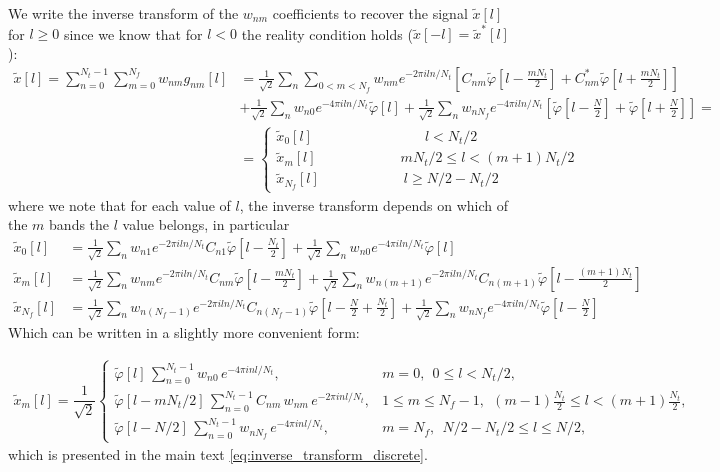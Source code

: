 \documentclass[twocolumn,preprintnumbers,
  superscriptaddress,
  nofootinbib,
  amsmath,
  amssymb,
  aps,
  prd,
  colorlinks=true,
  linkcolor=blue,
  urlcolor=blue,
  citecolor=blue,
  anchorcolor=blue
]{revtex4-2}
\begin{document}
We write the inverse transform of the $w_{nm}$ coefficients to recover the signal $\tilde x[l]$ for $l\geq 0$ since we know that for $l<0$ the reality condition holds ($\tilde x[-l]=\tilde x^*[l]$):
%
\begin{align}
\tilde x[l]=\sum_{n=0}^{N_t-1}\sum_{m=0}^{N_f}w_{nm}g_{nm}[l]&=\frac{1}{\sqrt{2}}\sum_{n}\sum_{0<m<N_f}w_{nm}e^{-2\pi iln/N_t}\left[C_{nm}\tilde{\varphi}\!\left[l-\tfrac{mN_t}{2}\right]+C^*_{nm}\tilde{\varphi}\!\left[l+\tfrac{mN_t}{2}\right]\right]\nonumber\\
&+\frac{1}{\sqrt{2}}\sum_{n}w_{n0}e^{-4\pi iln/N_t}\tilde{\varphi}[l]+\frac{1}{\sqrt{2}}\sum_{n}w_{nN_f}e^{-4\pi iln/N_t}\left[\tilde{\varphi}\!\left[l-\tfrac{N}{2}\right]+\tilde{\varphi}\!\left[l+\tfrac{N}{2}\right]\right]=\nonumber\\
&=\begin{cases}
\tilde x_0[l]\qquad\qquad\qquad \qquad l<N_t/2\\
\tilde x_m[l]\qquad\qquad\qquad m N_t/2\leq l<(m+1)N_t/2\\
\tilde x_{N_f}[l]\qquad\qquad\qquad l \geq N/2-N_t/2
\end{cases}
\end{align}
%
where we note that for each value of $l$, the inverse transform depends on which of the $m$ bands the $l$ value belongs, in particular
%
\begin{align}
\tilde x_0[l]&=\frac{1}{\sqrt{2}}\sum_{n}w_{n1}e^{-2\pi iln/N_t}C_{n1}\tilde{\varphi}\!\left[l-\tfrac{N_t}{2}\right]+\frac{1}{\sqrt{2}}\sum_{n}w_{n0}e^{-4\pi iln/N_t}\tilde{\varphi}[l]\nonumber\\
\tilde x_m[l]&=\frac{1}{\sqrt{2}}\sum_n w_{nm}e^{-2\pi iln/N_t}C_{nm}\tilde{\varphi}\!\left[l-\tfrac{mN_t}{2}\right]+\frac{1}{\sqrt{2}}\sum_n w_{n(m+1)}e^{-2\pi iln/N_t}C_{n(m+1)}\tilde{\varphi}\!\left[l-\tfrac{(m+1)N_t}{2}\right]\nonumber\\
\tilde x_{N_f}[l]&=\frac{1}{\sqrt{2}}\sum_n w_{n(N_f-1)}e^{-2\pi iln/N_t}C_{n(N_f-1)}\tilde{\varphi}\!\left[l-\tfrac{N}{2}+\tfrac{N_t}{2}\right]+\frac{1}{\sqrt{2}}\sum_n w_{n N_f}e^{-4\pi iln/N_t}\tilde{\varphi}\!\left[l-\tfrac{N}{2}\right]
\end{align}
Which can be written in a slightly more convenient form:

\begin{align}
\tilde{x}_m[l] = \dfrac{1}{\sqrt{2}}
\begin{cases}
\tilde{\varphi}[l]\, \displaystyle\sum_{n=0}^{N_t - 1} w_{n0}\, e^{-4\pi i n l / N_t},
& m = 0,\ \ 0 \le l < N_t/2, \\[10pt]
\tilde{\varphi}[l - mN_t/2]\, \displaystyle\sum_{n=0}^{N_t - 1} C_{nm}\, w_{nm}\, e^{-2\pi i n l / N_t},
& 1 \le m \le N_f - 1,\ \ (m{-}1)\tfrac{N_t}{2} \le l < (m{+}1)\tfrac{N_t}{2}, \\[10pt]
\tilde{\varphi}[l - N/2]\, \displaystyle\sum_{n=0}^{N_t - 1} w_{nN_f}\, e^{-4\pi i n l / N_t},
& m = N_f,\ \ N/2 - N_t/2 \le l \le N/2,
\end{cases}
\end{align}
which is presented in the main text \eqref{eq:inverse_transform_discrete}. 
\end{document}
